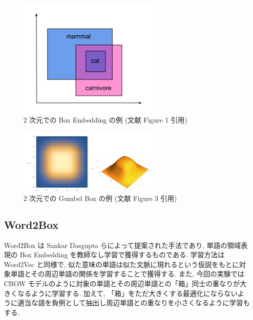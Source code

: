 \documentclass[twocolumn]{jarticle}     %
\begin{document}
\begin{figure}[t]
  \centering
  \caption{2 次元での Box Embedding の例 (文献 \cite{li2018smoothing} Figure 1 引用)}
  \label{fig:box_embedding2d}
  \includegraphics[width=70mm]{BoxEmbedding_2d.png}
\end{figure}

\begin{figure}[t]
  \centering
  \caption{2 次元での Gumbel Box の例 (文献 \cite{pmlr-v161-boratko21a} Figure 3 引用)}
  \label{fig:gumbel_box}
  \includegraphics[width=70mm]{GumbelBoxes.png}
\end{figure}


\subsection{Word2Box}
Word2Box \cite{dasgupta-etal-2022-word2box} は Sankar Dasgupta らによって提案された手法であり, 単語の領域表現の Box Embedding を教師なし学習で獲得するものである. 
学習方法は Word2Vec \cite{word2vec} と同様で, 似た意味の単語は似た文脈に現れるという仮説をもとに対象単語とその周辺単語の関係を学習することで獲得する. 
また, 今回の実験では CBOW モデルのように対象の単語とその周辺単語との「箱」同士の重なりが大きくなるように学習する. 
加えて, 「箱」をただ大きくする最適化にならないように適当な語を負例として抽出し周辺単語との重なりを小さくなるように学習もする. 
\end{document}
